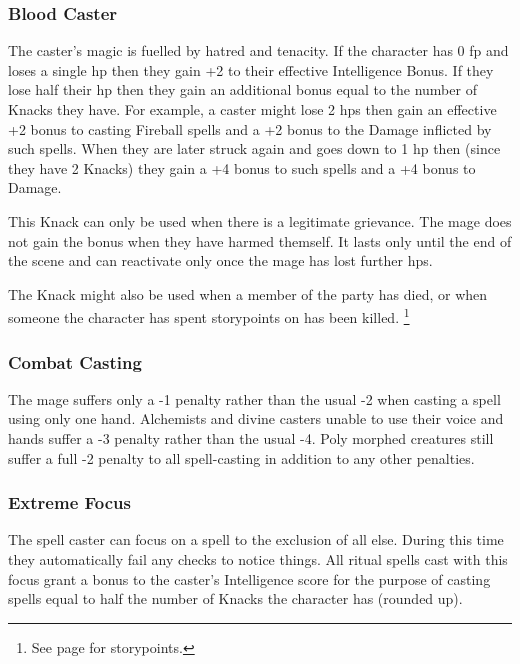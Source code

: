\begin{multicols}{2}

\subsubsection{Blood Caster}

The caster's magic is fuelled by hatred and tenacity.
If the character has 0 \gls{fp} and loses a single \gls{hp} then they gain +2 to their effective Intelligence Bonus.
If they lose half their \gls{hp} then they gain an additional bonus equal to the number of Knacks they have.
For example, a caster might lose 2 \glspl{hp} then gain an effective +2 bonus to casting Fireball spells and a +2 bonus to the Damage inflicted by such spells.
When they are later struck again and goes down to 1 \gls{hp} then (since they have 2 Knacks) they gain a +4 bonus to such spells and a +4 bonus to Damage.

This Knack can only be used when there is a legitimate grievance.
The mage does not gain the bonus when they have harmed themself.
It lasts only until the end of the scene and can reactivate only once the mage has lost further \glspl{hp}.

The Knack might also be used when a member of the party has died, or when someone the character has spent \glspl{storypoint} on has been killed.%
\footnote{See page \pageref{stories} for \glspl{storypoint}.}

\subsubsection{Combat Casting}

The mage suffers only a -1 penalty rather than the usual -2 when casting a spell using only one hand. Alchemists and divine casters unable to use their voice and hands suffer a -3 penalty rather than the usual -4. Poly morphed creatures still suffer a full -2 penalty to all spell-casting in addition to any other penalties.

\subsubsection{Extreme Focus}

The spell caster can focus on a spell to the exclusion of all else. During this time they automatically fail any checks to notice things. All ritual spells cast with this focus grant a bonus to the caster's Intelligence score for the purpose of casting spells equal to half the number of Knacks the character has (rounded up).


\end{multicols}
